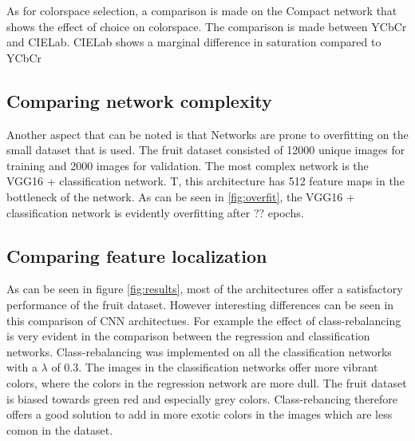As for colorspace selection, a comparison is made on the Compact network that shows the effect of choice on colorspace. The comparison is made between YCbCr and CIELab. CIELab shows a marginal difference in saturation compared to YCbCr 


\subsection{Comparing network complexity}
Another aspect that can be noted is that Networks are prone to overfitting on the small dataset that is used. The fruit dataset consisted of 12000 unique images for training and 2000 images for validation. The most complex network is the VGG16 + classification network. T, this architecture has 512 feature maps in the bottleneck of the network. As can be seen in \ref{fig:overfit}, the VGG16 + classification network is evidently overfitting after ?? epochs. 

\subsection{Comparing feature localization}
As can be seen in figure \ref{fig:results}, most of the architectures offer a satisfactory performance of the fruit dataset. However interesting differences can be seen in this comparison of CNN architectues. For example the effect of class-rebalancing is very evident in the comparison between the regression and classification networks. Class-rebalancing was implemented on all the classification networks with a $\lambda$ of 0.3. The images in the classification networks offer more vibrant colors, where the colors in the regression network are more dull. The fruit dataset is biased towards green red and especially grey colors. Class-rebancing therefore offers a good solution to add in more exotic colors in the images which are less comon in the dataset.


